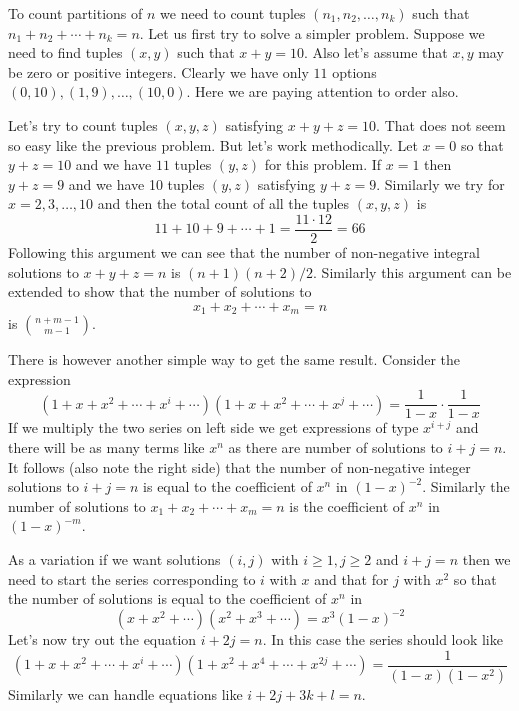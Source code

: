 To count partitions of $n$ we need to count tuples $(n_{1}, n_{2}, \ldots, n_{k})$ such that $n_{1} + n_{2} + \cdots + n_{k} = n$. Let us first try to solve a simpler problem. Suppose we need to find tuples $(x, y)$ such that $x + y = 10$. Also let's assume that $x, y$ may be zero or positive integers. Clearly we have only $11$ options $(0, 10), (1, 9), \ldots, (10, 0)$. Here we are paying attention to order also.

Let's try to count tuples $(x, y, z)$ satisfying $x + y + z = 10$. That does not seem so easy like the previous problem. But let's work methodically. Let $x = 0$ so that $y + z = 10$ and we have $11$ tuples $(y, z)$ for this problem. If $x = 1$ then $y + z = 9$ and we have 10 tuples $(y, z)$ satisfying $y + z = 9$. Similarly we try for $x = 2, 3, \ldots, 10$ and then the total count of all the tuples $(x, y, z)$ is $$11 + 10 + 9 + \cdots + 1 = \frac{11\cdot 12}{2} = 66$$ Following this argument we can see that the number of non-negative integral solutions to $x + y + z = n$ is $(n + 1)(n + 2)/2$. Similarly this argument can be extended to show that the number of solutions to $$x_{1} + x_{2} + \cdots + x_{m} = n$$ is $\displaystyle \binom{n + m - 1}{m - 1}$.

There is however another simple way to get the same result. Consider the expression $$(1 + x + x^{2} + \cdots + x^{i} + \cdots)(1 + x + x^{2} + \cdots + x^{j} + \cdots) = \frac{1}{1 - x}\cdot\frac{1}{1 - x}$$ If we multiply the two series on left side we get expressions of type $x^{i + j}$ and there will be as many terms like $x^{n}$ as there are number of solutions to $i + j = n$. It follows (also note the right side) that the number of non-negative integer solutions to $i + j = n$ is equal to the coefficient of $x^{n}$ in $(1 - x)^{-2}$. Similarly the number of solutions to $x_{1} + x_{2} + \cdots + x_{m} = n$ is the coefficient of $x^{n}$ in $(1 - x)^{-m}$.

As a variation if we want solutions $(i, j)$ with $i \geq 1, j \geq 2$ and $i + j = n$ then we need to start the series corresponding to $i$ with $x$ and that for $j$ with $x^{2}$ so that the number of solutions is equal to the coefficient of $x^{n}$ in $$(x + x^{2} + \cdots)(x^{2} + x^{3} + \cdots) = x^{3}(1 - x)^{-2}$$ Let's now try out the equation $i + 2j = n$. In this case the series should look like $$(1 + x + x^{2} + \cdots + x^{i} + \cdots)(1 + x^{2} + x^{4} + \cdots + x^{2j} + \cdots) = \frac{1}{(1 - x)(1 - x^{2})}$$ Similarly we can handle equations like $i + 2j + 3k + l = n$.

